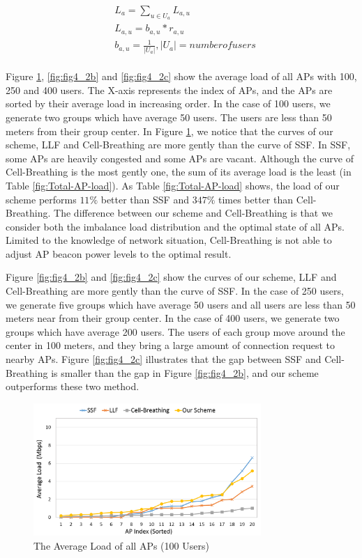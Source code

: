 \begin{align}
&L_a=\sum_{u\in{U_a}}L_{a,u}\\
&L_{a,u}=b_{a,u}*r_{a,u}\\
&b_{a,u}=\frac{1}{|U_a|}   ,|U_a|={number of users}
\end{align}
\\
Figure \ref{fig:fig4_2a}, \ref{fig:fig4_2b} and \ref{fig:fig4_2c} show the average load of all APs with 100, 250 and 400 users. The X-axis represents the index of APs, and the APs are sorted by their average load in increasing order. In the case of 100 users, we generate two groups which have average 50 users. The users are less than 50 meters from their group center. In Figure \ref{fig:fig4_2a}, we notice that the curves of our scheme, LLF and Cell-Breathing are more gently than the curve of SSF. In SSF, some APs are heavily congested and some APs are vacant.  Although the curve of Cell-Breathing is the most gently one, the sum of its average load is the least (in Table \ref{fig:Total-AP-load}). As Table \ref{fig:Total-AP-load} shows, the load of our scheme performs $11\%$ better than SSF and $347\%$ times better than Cell-Breathing. The difference between our scheme and Cell-Breathing is that we consider both the imbalance load distribution and the optimal state of all APs. Limited to the knowledge of network situation, Cell-Breathing is not able to adjust AP beacon power levels to the optimal result.

Figure \ref{fig:fig4_2b} and \ref{fig:fig4_2c} show the curves of our scheme, LLF and Cell-Breathing are more gently than the curve of SSF. In the case of 250 users, we generate five groups which have average 50 users and all users are less than 50 meters near from their group center. In the case of 400 users, we generate two groups which have average 200 users. The users of each group move around the center in 100 meters, and they bring a large amount of connection request to nearby APs. Figure \ref{fig:fig4_2c} illustrates that the gap between SSF and Cell-Breathing is smaller than the gap in Figure \ref{fig:fig4_2b}, and our scheme outperforms these two method.

\begin{figure}[tbp]
\setlength{\abovecaptionskip}{0pt}
\setlength{\belowcaptionskip}{0pt}
\begin{center}
\includegraphics[width=3.4in]{images/Average_AP_load_100.png}
\end{center}
\caption{The Average Load of all APs (100 Users)}
\label{fig:fig4_2a}
\end{figure}

